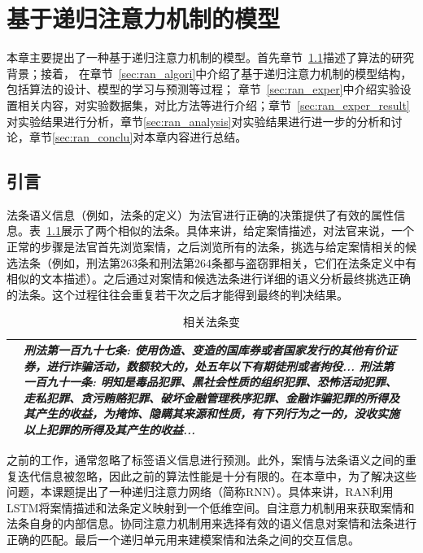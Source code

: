 
\chapter{基于递归注意力机制的模型}
本章主要提出了一种基于递归注意力机制的模型。首先章节~\ref{sec:ran_intro}描述了算法的研究背景；接着，
在章节~\ref{sec:ran_algori}中介绍了基于递归注意力机制的模型结构，包括算法的设计、模型的学习与预测等过程；
章节~\ref{sec:ran_exper}中介绍实验设置相关内容，对实验数据集，对比方法等进行介绍；章节~\ref{sec:ran_exper_result}
对实验结果进行分析，章节\ref{sec:ran_analysis}对实验结果进行进一步的分析和讨论，章节\ref{sec:ran_conclu}对本章内容进行总结。

\section{引言}
\label{sec:ran_intro}
法条语义信息（例如，法条的定义）为法官进行正确的决策提供了有效的属性信息。表~\ref{t:similar_article}展示了两个相似的法条。具体来讲，给定案情描述，对法官来说，一个正常的步骤是法官首先浏览案情，之后浏览所有的法条，挑选与给定案情相关的候选法条（例如，刑法第263条和刑法第264条都与盗窃罪相关，它们在法条定义中有相似的文本描述）。之后通过对案情和候选法条进行详细的语义分析最终挑选正确的法条。这个过程往往会重复若干次之后才能得到最终的判决结果。

\begin{table}[htb]
    \caption{相关法条变}
    \label{t:similar_article}
    \centering
    \begin{tabular}{lp{12cm}p{7cm}}
    \hline
    &\emph{\textbf{刑法第一百九十七条}: 使用伪造、变造的国库券或者国家发行的其他有价证券，进行\emph{\textbf{诈骗}}活动，数额较大的，处五年以下有期徒刑或者拘役... \newline
    \textbf{刑法第一百九十一条}: 明知是毒品犯罪、黑社会性质的组织犯罪、恐怖活动犯罪、走私犯罪、贪污贿赂犯罪、破坏金融管理秩序犯罪、\emph{\textbf{金融诈骗}}犯罪的所得及其产生的收益，为掩饰、隐瞒其来源和性质，有下列行为之一的，没收实施以上犯罪的所得及其产生的收益...}\\
    \hline
    \end{tabular}
\end{table}

之前的工作，通常忽略了标签语义信息进行预测。此外，案情与法条语义之间的重复迭代信息被忽略，因此之前的算法性能是十分有限的。在本章中，为了解决这些问题，本课题提出了一种递归注意力网络（简称RNN）。具体来讲，RAN利用LSTM将案情描述和法条定义映射到一个低维空间。自注意力机制用来获取案情和法条自身的内部信息。协同注意力机制用来选择有效的语义信息对案情和法条进行正确的匹配。最后一个递归单元用来建模案情和法条之间的交互信息。

